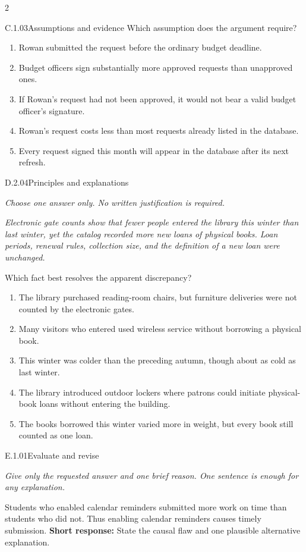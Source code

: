 \documentclass[9pt]{extarticle}
\newcommand{\choice}[1]{\item #1}
\begin{document}
\begin{multicols}{2}
\begin{DenseCoreProblem}{C.1.03}{Assumptions and evidence}
Which assumption does the argument require?
\begin{enumerate}[label=(\alph*)]
  \choice{Rowan submitted the request before the ordinary budget deadline.}
  \choice{Budget officers sign substantially more approved requests than unapproved ones.}
  \choice{If Rowan's request had not been approved, it would not bear a valid budget officer's signature.}
  \choice{Rowan's request costs less than most requests already listed in the database.}
  \choice{Every request signed this month will appear in the database after its next refresh.}
\end{enumerate}
\end{DenseCoreProblem}
\begin{DenseCoreProblem}{D.2.04}{Principles and explanations}
{\scriptsize\textit{Choose one answer only. No written justification is required.}\par}
\emph{Electronic gate counts show that fewer people entered the library this winter than last winter, yet the catalog recorded more new loans of physical books. Loan periods, renewal rules, collection size, and the definition of a new loan were unchanged.}

Which fact best resolves the apparent discrepancy?
\begin{enumerate}[label=(\alph*)]
  \choice{The library purchased reading-room chairs, but furniture deliveries were not counted by the electronic gates.}
  \choice{Many visitors who entered used wireless service without borrowing a physical book.}
  \choice{This winter was colder than the preceding autumn, though about as cold as last winter.}
  \choice{The library introduced outdoor lockers where patrons could initiate physical-book loans without entering the building.}
  \choice{The books borrowed this winter varied more in weight, but every book still counted as one loan.}
\end{enumerate}
\end{DenseCoreProblem}
\begin{DenseCoreProblem}{E.1.01}{Evaluate and revise}
{\scriptsize\textit{Give only the requested answer and one brief reason. One sentence is enough for any explanation.}\par}
Students who enabled calendar reminders submitted more work on time than students who did not. Thus enabling calendar reminders causes timely submission.
\textbf{Short response:} State the causal flaw and one plausible alternative explanation.
\end{DenseCoreProblem}
\end{multicols}
\end{document}
